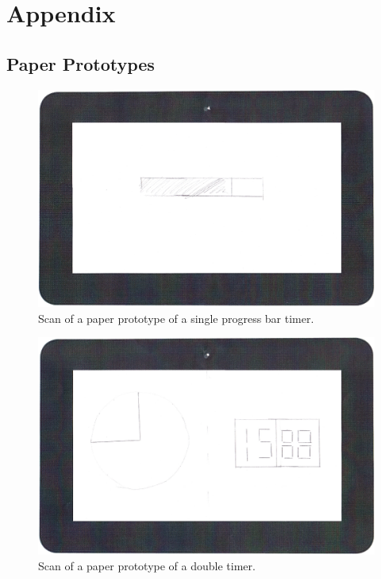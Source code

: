 \chapter*{Appendix}

\section{Paper Prototypes}
\label{sec:paper_prot}

	\begin{figure}[H]
		\centering
			\includegraphics[scale=0.7]{Images/paper_prototype/timer_1.png}
				\caption{Scan of a paper prototype of a single progress bar timer.}
		\label{fig:pap_prot_progbar}
	\end{figure}
	
	\begin{figure}[H]
		\centering
			\includegraphics[scale=0.7]{Images/paper_prototype/timer_2.png}
				\caption{Scan of a paper prototype of a double timer.}
		\label{fig:pap_prot_timedoub1}
	\end{figure}

